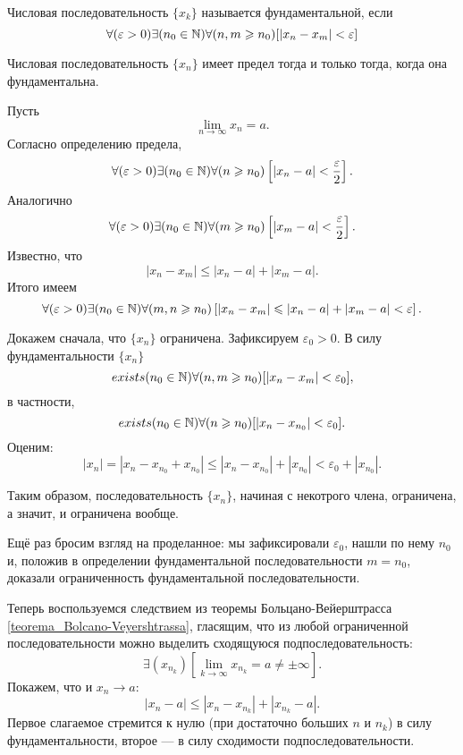 \opred
Числовая последовательность $\{x_k\}$ называется фундаментальной,
если
\begin{equation}\label{opr_fund_posled}
\forall (\varepsilon >0) \exists (n_0\in \mathbb{N} ) \forall (n,m\geqslant n_0) [|x_n-x_m| < \varepsilon ]
\end{equation}

\begin{teorema}
Числовая последовательность $\{x_n\}$ имеет предел тогда и только тогда, когда она фундаментальна.
\end{teorema}
\dokvo

\neobh
Пусть $$\lim_{n\to\infty} x_n = a.$$
Согласно определению предела,
$$
\forall(\varepsilon > 0) \exists(n_0 \in \mathbb{N}) \forall(n \geqslant n_0)\left[ |x_n -a| < \frac{\varepsilon}{2}\right].
$$
Аналогично
$$
\forall(\varepsilon > 0) \exists(n_0 \in \mathbb{N}) \forall(m \geqslant n_0)\left[ |x_m -a| < \frac{\varepsilon}{2}\right].
$$
Известно, что
$$
|x_n - x_m| \leq |x_n - a| + |x_m - a|.
$$
Итого имеем
$$
\forall(\varepsilon > 0) \exists(n_0 \in \mathbb{N}) \forall(m, n \geqslant n_0)\left[|x_n - x_m| \leqslant  |x_n -a| + |x_m -a| < \varepsilon\right].
$$

\dost

Докажем сначала, что $\{x_n\}$ ограничена.
Зафиксируем $\varepsilon_0 > 0$.
В силу фундаментальности $\{x_n\}$
$$
	exists (n_0\in \mathbb{N} ) \forall (n,m \geqslant n_0) [|x_n-x_m| < \varepsilon_0 ],
$$
в частности,
$$
	exists (n_0\in \mathbb{N} ) \forall (n \geqslant n_0) [|x_n-x_{n_0}| < \varepsilon_0 ].
$$
Оценим:
$$
	|x_n| = |x_n - x_{n_0} + x_{n_0} | \leq |x_n - x_{n_0}| + |x_{n_0} | < \varepsilon_0 + |x_{n_0}|.
$$

Таким образом, последовательность $\{x_n\}$, начиная с некотрого члена, ограничена, а значит, и ограничена вообще.

Ещё раз бросим взгляд на проделанное: мы зафиксировали $\varepsilon_0$, нашли по нему $n_0$ и,
положив в определении фундаментальной последовательности $m = n_0$,
доказали ограниченность фундаментальной последовательности.

Теперь воспользуемся следствием из теоремы Больцано-Вейерштрасса \ref{teorema_Bolcano-Veyershtrassa},
гласящим, что из любой ограниченной последовательности можно выделить сходящуюся подпоследовательность:
$$
	\exists(x_{n_k})\left[  \lim_{k\to\infty} x_{n_k} = a \ne\pm\infty \right].
$$
Покажем, что и $x_n \to a$:
$$
	|x_n - a| \leq |x_n - x_{n_k}| + |x_{n_k}-a|.
$$
Первое слагаемое стремится к нулю (при достаточно больших $n$ и $n_k$) в силу фундаментальности,
второе --- в силу сходимости подпоследовательности.
\dokno


